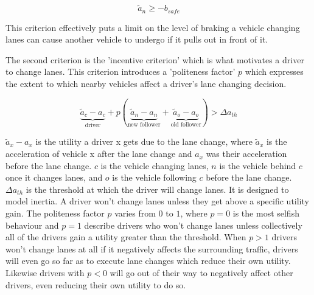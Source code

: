 
\begin{equation}
\tilde{a}_n \geq -b_{safe}
\end{equation}

This criterion effectively puts a limit on the level of braking a vehicle changing lanes can cause another vehicle to undergo if it pulls out in front of it.

The second criterion is the 'incentive criterion' which is what motivates a driver to change lanes. This criterion introduces a 'politeness factor' $p$ which expresses the extent to which nearby vehicles affect a driver's lane changing decision. 


\begin{equation}
\underbrace{\tilde{a}_c - a_c}_\text{driver} + p(\underbrace{\tilde{a}_n  - a_n}_\text{new follower} + \underbrace{\tilde{a}_o - a_o}_\text{old follower}) > \Delta a_{th}
\end{equation}

$\tilde{a}_x - a_x$ is the utility a driver x gets due to the lane change, where $\tilde{a}_x$ is the acceleration of vehicle x after the lane change and $a_x$ was their acceleration before the lane change. $c$ is the vehicle changing lanes, $n$ is the vehicle behind $c$ once it changes lanes, and $o$ is the vehicle following $c$ before the lane change. $\Delta a_{th}$ is the threshold at which the driver will change lanes. It is designed to model inertia. A driver won't change lanes unless they get above a specific utility gain. The politeness factor $p$ varies from $0$ to $1$, where $p = 0$ is the most selfish behaviour and $p = 1$ describe drivers who won't change lanes unless collectively all of the drivers gain a utility greater than the threshold. When $p > 1$ drivers won't change lanes at all if it negatively affects the surrounding traffic, drivers will even go so far as to execute lane changes which reduce their own utility. Likewise drivers with $p < 0$ will go out of their way to negatively affect other drivers, even reducing their own utility to do so.

